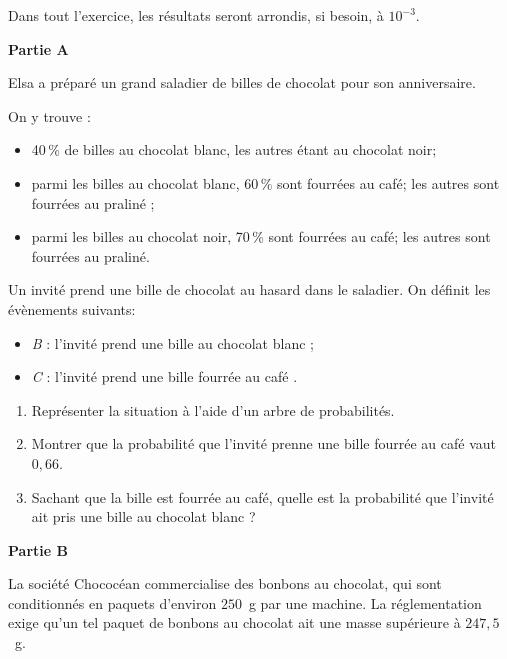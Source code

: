 \documentclass[10pt,a4paper]{article}
\begin{document}
Dans tout l'exercice, les résultats seront arrondis, si besoin, à $10^{-3}$.

\bigskip

\textbf{Partie A}

\medskip

Elsa a préparé un grand saladier de billes de chocolat pour son anniversaire.

On y trouve :

\begin{itemize}
\item  40\,\% de billes au chocolat blanc, les autres étant au chocolat noir;
\item  parmi les billes au chocolat blanc, 60\,\% sont fourrées au café; les autres sont
fourrées au praliné ;
\item  parmi les billes au chocolat noir, 70\,\% sont fourrées au café; les autres sont fourrées
au praliné.
\end{itemize}

Un invité prend une bille de chocolat au hasard dans le saladier.
On définit les évènements suivants:

\begin{itemize}
\item \emph{B} : \og l'invité prend une bille au chocolat blanc \fg{} ;
\item \emph{C} : \og l'invité prend une bille fourrée au café \fg.
\end{itemize}

\medskip

\begin{enumerate}
\item Représenter la situation à l'aide d'un arbre de probabilités.
\item Montrer que la probabilité que l'invité prenne une bille fourrée au café vaut $0,66$.
\item Sachant que la bille est fourrée au café, quelle est la probabilité que l'invité ait pris
une bille au chocolat blanc ?
\end{enumerate}

\bigskip

\textbf{Partie B}

\medskip

La société Chococéan commercialise des bonbons au chocolat, qui sont conditionnés en
paquets d'environ $250$~g par une machine. La réglementation exige qu'un tel paquet de
bonbons au chocolat ait une masse supérieure à $247,5$~g.
\end{document}
